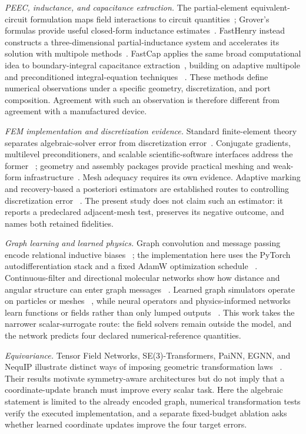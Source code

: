 \documentclass[journal]{IEEEtran}
\begin{document}
\textit{PEEC, inductance, and capacitance extraction.}
The partial-element equivalent-circuit formulation maps field interactions to
circuit quantities~\cite{ruehli}; Grover's formulas provide useful closed-form
inductance estimates~\cite{grover}. FastHenry instead constructs a
three-dimensional partial-inductance system and accelerates its solution with
multipole methods~\cite{fasthenry}. FastCap applies the same broad computational
idea to boundary-integral capacitance extraction~\cite{fastcap}, building on
adaptive multipole and preconditioned integral-equation techniques
~\cite{carrier88,nabors94}. These methods define numerical observations under a
specific geometry, discretization, and port composition. Agreement with such an
observation is therefore different from agreement with a manufactured device.

\textit{FEM implementation and discretization evidence.}
Standard finite-element theory separates algebraic-solver error from
discretization error~\cite{brenner}. Conjugate gradients, multilevel
preconditioners, and scalable scientific-software interfaces address the former
~\cite{hestenes,hypre,petsc}; geometry and assembly packages provide practical
meshing and weak-form infrastructure~\cite{gmsh,skfem}. Mesh adequacy requires
its own evidence. Adaptive marking and recovery-based a posteriori estimators
are established routes to controlling discretization error
~\cite{doerfler,zienkiewicz}. The present study does not claim such an estimator:
it reports a predeclared adjacent-mesh test, preserves its negative outcome,
and names both retained fidelities.

\textit{Graph learning and learned physics.}
Graph convolution and message passing encode relational inductive biases
~\cite{kipf,gin,gilmer,battaglia}; the implementation here uses the PyTorch
autodifferentiation stack and a fixed AdamW optimization schedule
~\cite{pytorch,adamw}. Continuous-filter and directional molecular networks show
how distance and angular structure can enter graph messages
~\cite{schnet,dimenet}. Learned graph simulators operate on particles or meshes
~\cite{sanchez,pfaff}, while neural operators and physics-informed networks
learn functions or fields rather than only lumped outputs
~\cite{fno,deeponet,pinn}. This work takes the narrower scalar-surrogate route:
the field solvers remain outside the model, and the network predicts four
declared numerical-reference quantities.

\textit{Equivariance.}
Tensor Field Networks, SE(3)-Transformers, PaiNN, EGNN, and NequIP illustrate
distinct ways of imposing geometric transformation laws
~\cite{tfn,se3transformer,painn,egnn,nequip}. Their results motivate
symmetry-aware architectures but do not imply that a coordinate-update branch
must improve every scalar task. Here the algebraic statement is limited to the
already encoded graph, numerical transformation tests verify the executed
implementation, and a separate fixed-budget ablation asks whether learned
coordinate updates improve the four target errors.
\end{document}

